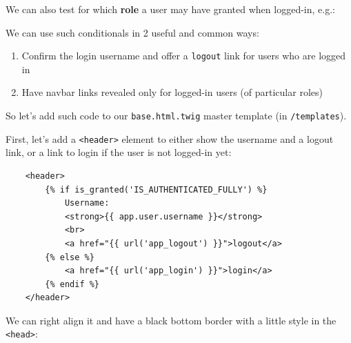 \documentclass[a4paperpaper,openright]{book}
\newenvironment{Shaded}{}{}
\newcommand{\ConstantTok}[1]{\textcolor[rgb]{0.53,0.00,0.00}{#1}}
\newcommand{\DataTypeTok}[1]{\textcolor[rgb]{0.56,0.13,0.00}{#1}}
\newcommand{\DecValTok}[1]{\textcolor[rgb]{0.25,0.63,0.44}{#1}}
\newcommand{\KeywordTok}[1]{\textcolor[rgb]{0.00,0.44,0.13}{\textbf{#1}}}
\newcommand{\NormalTok}[1]{#1}
\newcommand{\OperatorTok}[1]{\textcolor[rgb]{0.40,0.40,0.40}{#1}}
\begin{document}
We can also test for which \textbf{role} a user may have granted when
logged-in, e.g.:

\begin{Shaded}
\end{Shaded}

We can use such conditionals in 2 useful and common ways:

\begin{enumerate}
\def\labelenumi{\arabic{enumi}.}
\item
  Confirm the login username and offer a \texttt{logout} link for users
  who are logged in
\item
  Have navbar links revealed only for logged-in users (of particular
  roles)
\end{enumerate}

So let's add such code to our \texttt{base.html.twig} master template
(in \texttt{/templates}).

First, let's add a \texttt{\textless{}header\textgreater{}} element to
either show the username and a logout link, or a link to login if the
user is not logged-in yet:

\begin{verbatim}
    <header>
        {% if is_granted('IS_AUTHENTICATED_FULLY') %}
            Username:
            <strong>{{ app.user.username }}</strong>
            <br>
            <a href="{{ url('app_logout') }}">logout</a>
        {% else %}
            <a href="{{ url('app_login') }}">login</a>
        {% endif %}
    </header>
\end{verbatim}

We can right align it and have a black bottom border with a little style
in the \texttt{\textless{}head\textgreater{}}:

\begin{Shaded}
\end{Shaded}
\end{document}
